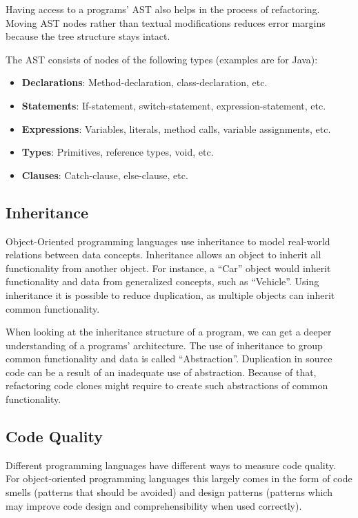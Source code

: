 Having access to a programs' AST also helps in the process of refactoring. Moving AST nodes rather than textual modifications reduces error margins because the tree structure stays intact.

The AST consists of nodes of the following types (examples are for Java):
\begin{itemize}
  \item \textbf{Declarations}: Method-declaration, class-declaration, etc.
  \item \textbf{Statements}: If-statement, switch-statement, expression-statement, etc.
  \item \textbf{Expressions}: Variables, literals, method calls, variable assignments, etc.
  \item \textbf{Types}: Primitives, reference types, void, etc.
  \item \textbf{Clauses}: Catch-clause, else-clause, etc.
\end{itemize}

\subsection{Inheritance}
Object-Oriented programming languages use inheritance to model real-world relations between data concepts. Inheritance allows an object to inherit all functionality from another object. For instance, a ``Car'' object would inherit functionality and data from generalized concepts, such as ``Vehicle''. Using inheritance it is possible to reduce duplication, as multiple objects can inherit common functionality.

When looking at the inheritance structure of a program, we can get a deeper understanding of a programs' architecture. The use of inheritance to group common functionality and data is called ``Abstraction''. Duplication in source code can be a result of an inadequate use of abstraction. Because of that, refactoring code clones might require to create such abstractions of common functionality.

\subsection{Code Quality}
Different programming languages have different ways to measure code quality. For object-oriented programming languages this largely comes in the form of code smells (patterns that should be avoided) and design patterns (patterns which may improve code design and comprehensibility when used correctly).

